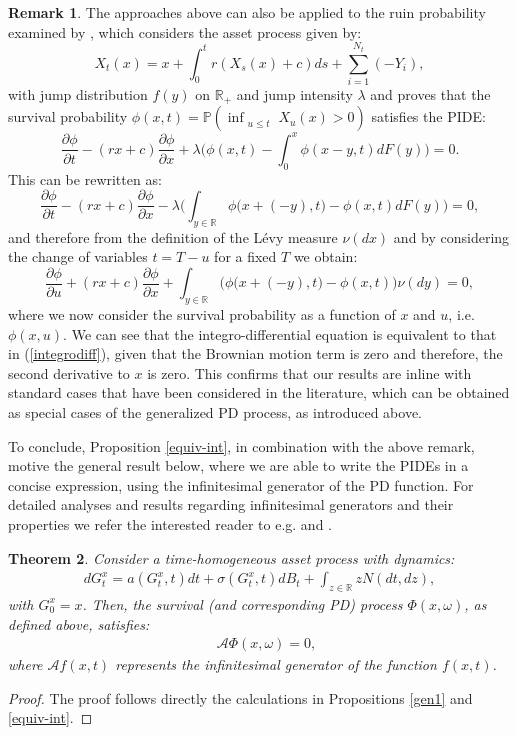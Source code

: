 \documentclass[11pt,reqno]{article}
\newtheorem{theorem}{Theorem}[section]
\theoremstyle{definition}
\newtheorem{remark}[theorem]{Remark}
\begin{document}
\begin{remark} \label{mis}
	The approaches above can also be applied to the ruin probability examined by \cite{mishura2016ruin}, which considers the asset process given by:
	$$X_t(x)  = x + \int_{0}^{t} r(X_s(x) + c) ds + \sum_{i=1}^{N_t} (-Y_i),$$ with jump distribution $f(y)$ on $\mathbb{R_+}$ and jump intensity $\lambda$ and proves that the survival probability $\phi(x,t) = \mathbb{P}(\inf_{\substack{u \leq t}} X_u(x) > 0)$ satisfies the PIDE:
	$$ \frac{\partial \phi}{\partial t} - (rx+c)\frac{\partial \phi}{\partial x} +  \lambda \Big(\phi(x,t) - \int_{0}^{x} \phi(x-y,t) dF(y) \Big)  = 0.$$
	This can be rewritten as:
	$$ \frac{\partial \phi}{\partial t} - (rx+c)\frac{\partial \phi}{\partial x} -  \lambda \Big( \int_{y \in \mathbb{R}} \phi\big(x+(-y),t\big) - \phi(x,t) dF(y) \Big)  = 0,$$
	and therefore from the definition of the L\'evy measure $\nu(dx)$ and by considering the change of variables $t = T-u$ for a fixed $T$ we obtain: 
	$$ \frac{\partial \phi}{\partial u} + (rx+c)\frac{\partial \phi}{\partial x} + \int_{y \in \mathbb{R}} \Big(\phi\big(x+(-y),t\big) - \phi(x,t) \Big)\nu(dy)   = 0,$$
	where we now consider the survival probability as a function of $x$ and $u$, i.e. $\phi(x,u)$. We can see that the integro-differential equation is equivalent to that in (\ref{integrodiff}), given that the Brownian motion term is zero and therefore, the second derivative to $x$ is zero. This confirms that our results are inline with standard cases that have been considered in the literature, which can be obtained as special cases of the generalized PD process, as introduced above. 
	
\end{remark}
To conclude, Proposition \ref{equiv-int}, in combination with the above remark, motive the general result below, where we are able to write the PIDEs in a concise expression, using the infinitesimal generator of the PD function. For detailed analyses and results regarding infinitesimal generators and their properties we refer the interested reader to e.g. \cite{applebaum2009levy} and \cite{oksendal2007applied}.

\begin{theorem} \label{infgen}
	Consider a time-homogeneous asset process with dynamics:
	\begin{eqnarray}
		dG^x_t = a(G^x_t,t)dt + \sigma(G^x_t,t)dB_t + \int_{z \in \mathbb{R}} z N(dt,dz),
	\end{eqnarray}
with $G^x_0=x$. Then, the survival (and corresponding PD) process $\Phi(x,\omega)$, as defined above, satisfies:
\begin{eqnarray}
 \quad \mathcal{A} 	\Phi(x,\omega) =0,
\end{eqnarray}
where $\mathcal{A}f(x,t)$ represents the infinitesimal generator of the function $f(x,t)$.
\end{theorem}
\begin{proof}
	The proof follows directly the calculations in Propositions \ref{gen1} and \ref{equiv-int}.
\end{proof}
\end{document}
